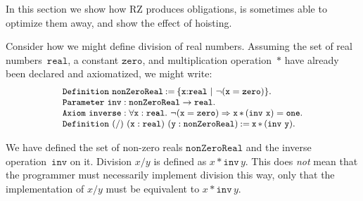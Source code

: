 In this section we show how RZ produces obligations, is sometimes able
to optimize them away, and show the effect of hoisting.

Consider how we might define division of real numbers. Assuming the
set of real numbers~$\mathtt{real}$, a constant $\mathtt{zero}$, and
multiplication operation~$\mathtt{*}$ have already been declared and
axiomatized, we might write:
%
\[
\footnotesize
\begin{array}{l}
\iDefinition{\mathtt{nonZeroReal}}{\isubset{\mathtt{x}}{\mathtt{real}}{\lnot(\mathtt{x}=\mathtt{zero})}}.\\
\iParameter{\mathtt{inv}}{\mathtt{nonZeroReal}\to\mathtt{real}}.\\
\iAxiom{\mathtt{inverse}}{\forall\mathtt{x}:\mathtt{real}.\ \lnot(\mathtt{x}=\mathtt{zero}) \Rightarrow \mathtt{x}\,\mathtt{*}\,(\mathtt{inv\ x}) = \mathtt{one}}.\\
\iDefinition{\mathtt{(/)}\ (\mathtt{x}:\mathtt{real})\ (\mathtt{y}:\mathtt{nonZeroReal})} {\mathtt{x}\,\mathtt{*}\,(\mathtt{inv\ y})}.\\
\end{array}
\]
\iffalse
\begin{source}
Definition nonZeroReal := {x : real | not (x = zero)}.
Parameter inv : nonZeroReal -> real.
Axiom inverse : forall x : real, (not x = zero) -> x * (inv x) = one.
Definition (/) (x : real) (y : nonZeroReal) := x * (inv y).
\end{source}
\fi
%
We have defined the set of non-zero reals $\mathtt{nonZeroReal}$ and
the inverse operation~$\mathtt{inv}$ on it. Division $x/y$ is defined
as $x * \mathtt{inv}\,y$. This does \emph{not} mean that the
programmer must necessarily implement division this way, only that the
implementation of $x/y$ must be equivalent to $x * \mathtt{inv}\,y$.


